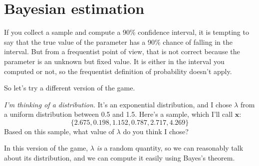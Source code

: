 \documentclass[12pt]{book}
\begin{document}








\section{Bayesian estimation}

If you collect a sample and compute a 90\% confidence interval, it is
tempting to say that the true value of the parameter has a 90\% chance
of falling in the interval.  But from a frequentist point of view,
that is not correct because the parameter is an unknown but fixed
value.  It is either in the interval you computed or not, so the
frequentist definition of probability doesn't apply.


So let's try a different version of the game.

\newcommand{\boldx}{\mathbf{x}}



{\em I'm thinking of a distribution.}  It's an exponential
distribution, and I chose $\lambda$ from a uniform distribution
between 0.5 and 1.5.  Here's a sample, which I'll call $\boldx$:
%
\[ \{ 2.675, 0.198, 1.152, 0.787, 2.717, 4.269 \} \]
%
Based on this sample, what value of $\lambda$ do you think I chose?

In this version of the game, $\lambda$ {\em is} a random quantity, so we
can reasonably talk about its distribution, and we can compute it
easily using Bayes's theorem.
\end{document}
